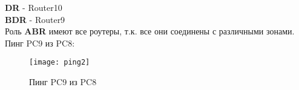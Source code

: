 \documentclass[a4paper, 14pt]{article}
\begin{document}
\textbf{DR} -  Router10\\

\textbf{BDR} -  Router9\\

Роль \textbf{ABR} имеют все роутеры, т.к. все они соединены с различными зонами.\\

Пинг PC9 из PC8:

\begin{figure}[H]
	\begin{center} 
    \texttt{[image: ping2]}
    \caption{Пинг PC9 из PC8}
    \label{fig:2}
    \end{center}
\end{figure}
\end{document}
